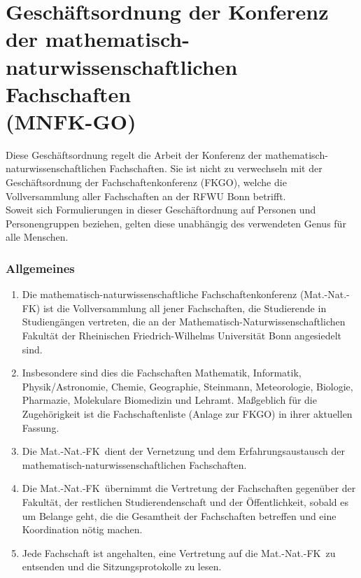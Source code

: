 \documentclass{article}
\begin{document}
	\newcommand{\mnfk}{Mat.-Nat.-FK\ }
	\part*{Geschäftsordnung der Konferenz der mathematisch-naturwissenschaftlichen Fachschaften \\ (MNFK-GO)}
	\fontsize{10pt}{10pt}\selectfont
	\vspace{0,3cm} Diese Geschäftsordnung regelt die Arbeit der Konferenz der mathematisch-naturwissenschaftlichen Fachschaften. Sie ist nicht zu verwechseln mit der Geschäftsordnung der Fachschaftenkonferenz (FKGO), welche die Vollversammlung aller Fachschaften an der RFWU Bonn betrifft.\\
	Soweit sich Formulierungen in dieser Geschäftordnung auf Personen und Personengruppen beziehen, gelten diese unabhängig des verwendeten Genus für alle Menschen.
	\fontsize{11pt}{13pt}\selectfont
	\section{Allgemeines}
	\begin{enumerate}[(1)]
		\setlength\itemsep{0pt}
		\item Die mathematisch-naturwissenschaftliche Fachschaftenkonferenz (Mat.-Nat.-FK) ist die Vollversammlung all jener Fachschaften, die Studierende in Studiengängen vertreten, die an der  \linebreak[4]Mathematisch-Naturwissenschaftlichen Fakultät der Rheinischen Friedrich-Wilhelms Universität Bonn angesiedelt sind.
		\item Insbesondere sind dies die Fachschaften Mathematik, Informatik, Physik/Astronomie, Chemie, Geographie, Steinmann, Meteorologie, Biologie, Pharmazie, Molekulare Biomedizin und Lehramt.
		Maßgeblich für die Zugehörigkeit ist die Fachschaftenliste (Anlage zur FKGO) in ihrer aktuellen Fassung.
		\item Die \mnfk dient der Vernetzung und dem Erfahrungsaustausch der \linebreak mathematisch-naturwissenschaftlichen Fachschaften.
		\item Die \mnfk übernimmt die Vertretung der Fachschaften gegenüber der Fakultät, der restlichen Studierendenschaft und der Öffentlichkeit, sobald es um Belange geht, die die Gesamtheit der Fachschaften betreffen und eine Koordination nötig machen.
		\item Jede Fachschaft ist angehalten, eine Vertretung auf die \mnfk zu entsenden und die Sitzungsprotokolle zu lesen.
	\end{enumerate}
\end{document}
